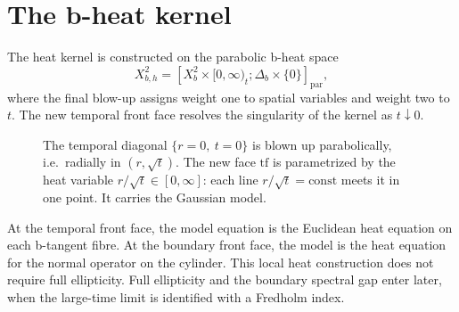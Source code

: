 \documentclass[12pt,oneside,reqno]{article}
\theoremstyle{plain}
\theoremstyle{definition}
\theoremstyle{remark}
\begin{document}
\section{The b-heat kernel}

The heat kernel is constructed on the parabolic b-heat space
\[
 X_{b,h}^2
 =
 \left[
 X_b^2\times[0,\infty)_t;
 \Delta_b\times\{0\}
 \right]_{\mathrm{par}},
\]
where the final blow-up assigns weight one to spatial variables and weight
two to \(t\). The new temporal front face resolves the singularity of the
kernel as \(t\downarrow0\).

\begin{figure}[htbp]
\centering
{}
\caption[Parabolic blow-up of the temporal diagonal]{The temporal
diagonal \(\{r=0,\ t=0\}\) is blown up parabolically, i.e.\ radially in
\((r,\sqrt t)\).  The new face \(\mathrm{tf}\) is parametrized by the heat
variable \(r/\sqrt t\in[0,\infty]\): each line \(r/\sqrt t=\mathrm{const}\)
meets it in one point.  It carries the Gaussian model.}
\end{figure}

At the temporal front face, the model equation is the Euclidean heat
equation on each b-tangent fibre. At the boundary front face, the model is
the heat equation for the normal operator on the cylinder. This local heat
construction does not require full ellipticity. Full ellipticity and the
boundary spectral gap enter later, when the large-time limit is identified
with a Fredholm index.
\end{document}
